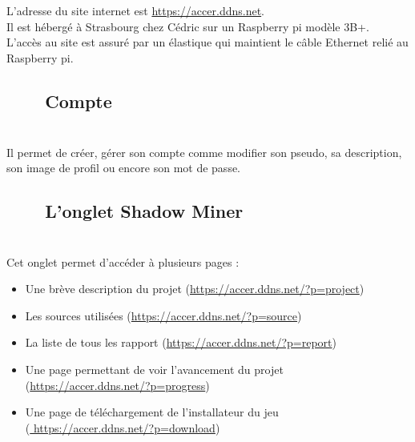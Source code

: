 \documentclass[titlepage, 13px, a4paper]{report}
\begin{document}
\paragraph{} \hspace{0pt} \\
L'adresse du site internet est \url{https://accer.ddns.net}. \\
Il est hébergé à Strasbourg chez Cédric sur un Raspberry pi modèle 3B+. \\
L’accès au site est assuré par un élastique qui maintient le câble Ethernet relié au Raspberry pi. \\

\subsection[Compte]{~~~~Compte}
\paragraph{} \hspace{0pt} \\
Il permet de créer, gérer son compte comme modifier son pseudo, sa description, son image de profil ou encore son mot de passe. \\

\subsection[L’onglet Shadow Miner]{~~~~L’onglet Shadow Miner}
\paragraph{} \hspace{0pt} \\
Cet onglet permet d’accéder à plusieurs pages : \\
{\begin{itemize}
	\item Une brève description du projet (\url{https://accer.ddns.net/?p=project})
	\item Les sources utilisées (\url{https://accer.ddns.net/?p=source})
	\item La liste de tous les rapport (\url{https://accer.ddns.net/?p=report})
	\item Une page permettant de voir l’avancement du projet \\
		(\url{https://accer.ddns.net/?p=progress})
	\item Une page de téléchargement de l’installateur du jeu \\
		(\url{ https://accer.ddns.net/?p=download}) \\
\end{itemize}}
\end{document}

